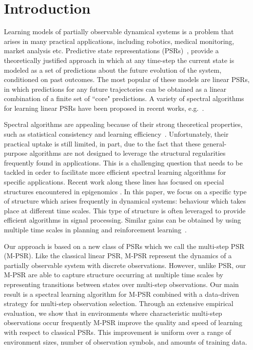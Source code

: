 \section{Introduction}

Learning models of partially observable dynamical systems is a problem that arises in many practical applications, including robotics, medical monitoring, market analysis etc.  Predictive state representations (PSRs)~\cite{littmanpsr,singh04,rosencrantz04}, provide a theoretically justified approach in which at any time-step the current state is modeled as a set of predictions about the future evolution of the system, conditioned on past outcomes.  The most popular of these models are linear PSRs, in which predictions for any future trajectories can be obtained as a linear combination of a finite set of ``core" predictions. A variety of spectral algorithms for learning linear PSRs have been proposed in recent works, e.g.~\cite{bootspsr,Hamilton2013}.

Spectral algorithms are appealing because of their strong theoretical properties, such as statistical consistency and learning efficiency~\cite{hsu09,bailly10}. Unfortunately, their practical uptake is still limited, in part, due to the fact that these general-purpose algorithms are not designed to leverage the structural regularities frequently found in applications. This is a challenging question that needs to be tackled in order to facilitate more efficient spectral learning algorithms for specific applications. Recent work along these lines has focused on special structures encountered in epigenomics \cite{zhang2015spectral}. In this paper, we focus on a specific type of structure which arises frequently in dynamical systems: behaviour which takes place at different time scales. This type of structure is often leveraged to provide efficient algorithms in signal processing. Similar gains can be obtained by using multiple time scales in planning and reinforcement learning~\cite{sutton99}.

Our approach is based on a new class of PSRs which we call the multi-step PSR (M-PSR). Like the classical linear PSR, M-PSR represent the dynamics of a partially observable system with discrete observations. However, unlike PSR, our M-PSR are able to capture structure occurring at multiple time scales by representing transitions between states over multi-step observations. Our main result is a spectral learning algorithm for M-PSR combined with a data-driven strategy for multi-step observation selection. Through an extensive empirical evaluation, we show that in environments where characteristic multi-step observations occur frequently M-PSR improve the quality and speed of learning with respect to classical PSRs. This improvement is uniform over a range of environment sizes, number of observation symbols, and amounts of training data. 
